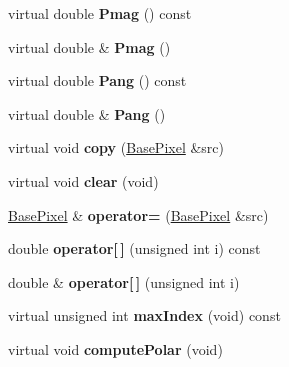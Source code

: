 \begin{DoxyCompactItemize}
\item 
\hypertarget{classBasePixel_a533e02e0e86a68db37c3ea8207bd5135}{
virtual double {\bfseries Pmag} () const }
\label{classBasePixel_a533e02e0e86a68db37c3ea8207bd5135}

\item 
\hypertarget{classBasePixel_ab41f1100ce852dc51bc3919ecae1ba09}{
virtual double \& {\bfseries Pmag} ()}
\label{classBasePixel_ab41f1100ce852dc51bc3919ecae1ba09}

\item 
\hypertarget{classBasePixel_a3319acc56454e3787045e7960deb3bca}{
virtual double {\bfseries Pang} () const }
\label{classBasePixel_a3319acc56454e3787045e7960deb3bca}

\item 
\hypertarget{classBasePixel_a96f7cd688bb916fafc55d01455c31ab7}{
virtual double \& {\bfseries Pang} ()}
\label{classBasePixel_a96f7cd688bb916fafc55d01455c31ab7}

\item 
\hypertarget{classBasePixel_a0e5bbe23ceb22a6d7c3d1a8d249dcb6d}{
virtual void {\bfseries copy} (\hyperlink{classBasePixel}{BasePixel} \&src)}
\label{classBasePixel_a0e5bbe23ceb22a6d7c3d1a8d249dcb6d}

\item 
\hypertarget{classBasePixel_a491d096dcc48caaad9ef251b04c036ff}{
virtual void {\bfseries clear} (void)}
\label{classBasePixel_a491d096dcc48caaad9ef251b04c036ff}

\item 
\hypertarget{classBasePixel_a20bfe3491b2a148c8990c37eba4afcde}{
\hyperlink{classBasePixel}{BasePixel} \& {\bfseries operator=} (\hyperlink{classBasePixel}{BasePixel} \&src)}
\label{classBasePixel_a20bfe3491b2a148c8990c37eba4afcde}

\item 
\hypertarget{classBasePixel_a0227fa27e0f45e6e5c329deb94b100f9}{
double {\bfseries operator\mbox{[}$\,$\mbox{]}} (unsigned int i) const }
\label{classBasePixel_a0227fa27e0f45e6e5c329deb94b100f9}

\item 
\hypertarget{classBasePixel_ae2d4b39bacff097b5bd5abf0290204fb}{
double \& {\bfseries operator\mbox{[}$\,$\mbox{]}} (unsigned int i)}
\label{classBasePixel_ae2d4b39bacff097b5bd5abf0290204fb}

\item 
\hypertarget{classBasePixel_af7ecd24e8de2aad7338b1d996c48434f}{
virtual unsigned int {\bfseries maxIndex} (void) const }
\label{classBasePixel_af7ecd24e8de2aad7338b1d996c48434f}

\item 
\hypertarget{classBasePixel_ae11c34f93e686512964fe9db2c8abe54}{
virtual void {\bfseries computePolar} (void)}
\label{classBasePixel_ae11c34f93e686512964fe9db2c8abe54}

\end{DoxyCompactItemize}
